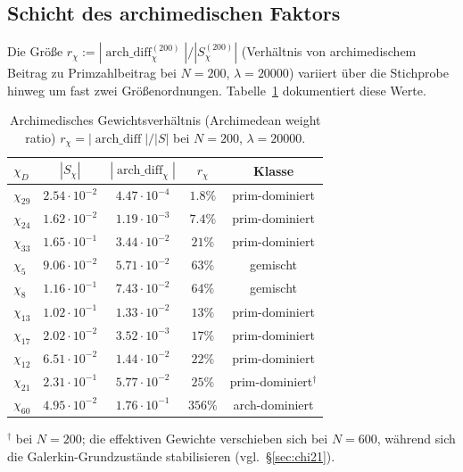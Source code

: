 \documentclass[10pt,twocolumn]{article}
\theoremstyle{definition}
\theoremstyle{remark}
\newcommand{\chifn}{\chi}
\newcommand{\archdiff}{\operatorname{arch\_diff}}
\begin{document}
\subsection{Schicht des archimedischen Faktors}
\label{sec:archlayer}

Die Größe
$r_{\chifn}:=|\archdiff_{\chifn}^{(200)}|/|S_{\chifn}^{(200)}|$
(Verhältnis von archimedischem Beitrag zu Primzahlbeitrag bei $N=200$,
$\lambda=20000$) variiert über die Stichprobe hinweg um fast zwei Größenordnungen.
Tabelle~\ref{tab:archratio} dokumentiert diese Werte.

\begin{table}[t]
\caption{Archimedisches Gewichtsverhältnis (Archimedean weight ratio)
  $r_{\chifn}=|\archdiff|/|S|$ bei $N=200$, $\lambda=20000$.}
\label{tab:archratio}
\centering\small
\begin{tabular}{@{}lcccc@{}}
\toprule
$\chifn_D$ & $|S_{\chifn}|$ & $|\archdiff_{\chifn}|$ & $r_{\chifn}$ & Klasse \\
\midrule
$\chifn_{29}$ & $2.54\!\cdot\!10^{-2}$ & $4.47\!\cdot\!10^{-4}$ & $1.8\%$ & prim-dominiert \\
$\chifn_{24}$ & $1.62\!\cdot\!10^{-2}$ & $1.19\!\cdot\!10^{-3}$ & $7.4\%$ & prim-dominiert \\
$\chifn_{33}$ & $1.65\!\cdot\!10^{-1}$ & $3.44\!\cdot\!10^{-2}$ & $21\%$ & prim-dominiert \\
$\chifn_5$ & $9.06\!\cdot\!10^{-2}$ & $5.71\!\cdot\!10^{-2}$ & $63\%$ & gemischt \\
$\chifn_8$ & $1.16\!\cdot\!10^{-1}$ & $7.43\!\cdot\!10^{-2}$ & $64\%$ & gemischt \\
$\chifn_{13}$ & $1.02\!\cdot\!10^{-1}$ & $1.33\!\cdot\!10^{-2}$ & $13\%$ & prim-dominiert \\
$\chifn_{17}$ & $2.02\!\cdot\!10^{-2}$ & $3.52\!\cdot\!10^{-3}$ & $17\%$ & prim-dominiert \\
$\chifn_{12}$ & $6.51\!\cdot\!10^{-2}$ & $1.44\!\cdot\!10^{-2}$ & $22\%$ & prim-dominiert \\
$\chifn_{21}$ & $2.31\!\cdot\!10^{-1}$ & $5.77\!\cdot\!10^{-2}$ & $25\%$ & prim-dominiert$^\dagger$ \\
$\chifn_{60}$ & $4.95\!\cdot\!10^{-2}$ & $1.76\!\cdot\!10^{-1}$ & $356\%$ & arch-dominiert \\
\bottomrule
\end{tabular}

\smallskip
\footnotesize
$^\dagger$ bei $N=200$; die effektiven Gewichte verschieben sich bei $N=600$,
während sich die Galerkin-Grundzustände stabilisieren (vgl.\ \S\ref{sec:chi21}).
\end{table}
\end{document}
